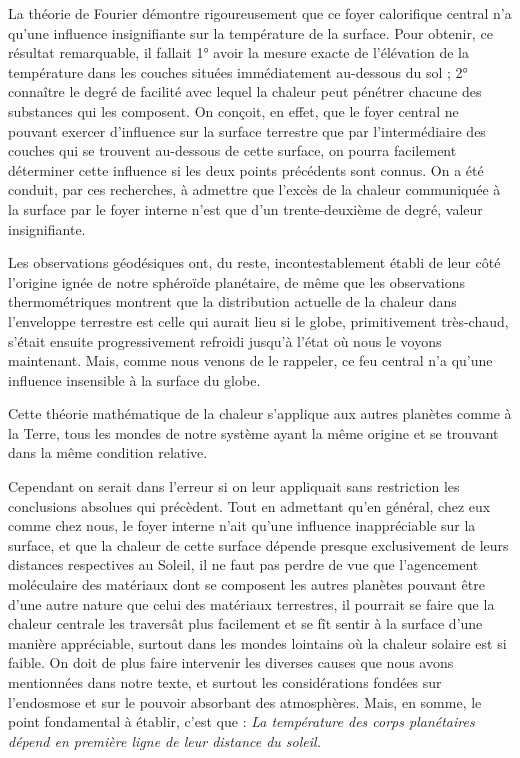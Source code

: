 \documentclass[a4paper, 11pt, oneside, landscape]{article}
\begin{document}
La théorie de Fourier démontre rigoureusement que ce foyer calorifique central n'a qu'une influence insignifiante sur la température de la surface. Pour obtenir, ce résultat remarquable, il fallait 1° avoir la mesure exacte de l'élévation de la température dans les couches situées immédiatement au-dessous du sol ; 2° connaître le degré de facilité avec lequel la chaleur peut pénétrer chacune des substances qui les composent. On conçoit, en effet, que le foyer central ne pouvant exercer d'influence sur la surface terrestre que par l'intermédiaire des couches qui se trouvent au-dessous de cette surface, on pourra facilement déterminer cette influence si les deux points précédents sont connus. On a été conduit, par ces recherches, à admettre que l'excès de la chaleur communiquée à la surface par le foyer interne n'est que d'un trente-deuxième de degré, valeur insignifiante.

Les observations géodésiques ont, du reste, incontestablement établi de leur côté l'origine ignée de notre sphéroïde planétaire, de même que les observations thermométriques montrent que la distribution actuelle de la chaleur dans l'enveloppe terrestre est celle qui aurait lieu si le globe, primitivement très-chaud, s'était ensuite progressivement refroidi jusqu'à l'état où nous le voyons maintenant. Mais, comme nous venons de le rappeler, ce feu central n'a qu'une influence insensible à la surface du globe.

Cette théorie mathématique de la chaleur s'applique aux autres planètes comme à la Terre, tous les mondes de notre système ayant la même origine et se trouvant dans la même condition relative.

Cependant on serait dans l'erreur si on leur appliquait sans restriction les conclusions absolues qui précèdent. Tout en admettant qu'en général, chez eux comme chez nous, le foyer interne n'ait qu'une influence inappréciable sur la surface, et que la chaleur de cette surface dépende presque exclusivement de leurs distances respectives au Soleil, il ne faut pas perdre de vue que l'agencement moléculaire des matériaux dont se composent les autres planètes pouvant être d'une autre nature que celui des matériaux terrestres, il pourrait se faire que la chaleur centrale les traversât plus facilement et se fît sentir à la surface d'une manière appréciable, surtout dans les mondes lointains où la chaleur solaire est si faible. On doit de plus faire intervenir les diverses causes que nous avons mentionnées dans notre texte, et surtout les considérations fondées sur l'endosmose et sur le pouvoir absorbant des atmosphères. Mais, en somme, le point fondamental à établir, c'est que : \emph{La température des corps planétaires dépend en première ligne de leur distance du soleil.}
\end{document}
